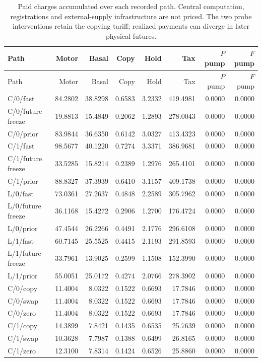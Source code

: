 \begin{longtable}{lrrrrrrr}
\caption{Paid charges accumulated over each recorded path. Central computation, registrations and external-supply infrastructure are not priced. The two probe interventions retain the copying tariff; realized payments can diverge in later physical futures.}\label{tab:young-paid}\\
\toprule
Path & Motor & Basal & Copy & Hold & Tax & $P$ pump & $F$ pump \\
\midrule\endfirsthead
\toprule
Path & Motor & Basal & Copy & Hold & Tax & $P$ pump & $F$ pump \\
\midrule\endhead
C/0/fast & 84.2802 & 38.8298 & 0.6583 & 3.2332 & 419.4981 & 0.0000 & 0.0000 \\
C/0/future freeze & 19.8813 & 15.4849 & 0.2062 & 1.2893 & 278.0043 & 0.0000 & 0.0000 \\
C/0/prior & 83.9844 & 36.6350 & 0.6142 & 3.0327 & 413.4323 & 0.0000 & 0.0000 \\
C/1/fast & 98.5677 & 40.1220 & 0.7274 & 3.3371 & 386.9681 & 0.0000 & 0.0000 \\
C/1/future freeze & 33.5285 & 15.8214 & 0.2389 & 1.2976 & 265.4101 & 0.0000 & 0.0000 \\
C/1/prior & 88.8327 & 37.3939 & 0.6410 & 3.1157 & 409.1738 & 0.0000 & 0.0000 \\
L/0/fast & 73.0361 & 27.2637 & 0.4848 & 2.2589 & 305.7962 & 0.0000 & 0.0000 \\
L/0/future freeze & 36.1168 & 15.4272 & 0.2906 & 1.2700 & 176.4724 & 0.0000 & 0.0000 \\
L/0/prior & 47.4544 & 26.2266 & 0.4491 & 2.1776 & 296.6108 & 0.0000 & 0.0000 \\
L/1/fast & 60.7145 & 25.5525 & 0.4415 & 2.1193 & 291.8593 & 0.0000 & 0.0000 \\
L/1/future freeze & 33.7961 & 13.9025 & 0.2599 & 1.1508 & 152.3990 & 0.0000 & 0.0000 \\
L/1/prior & 55.0051 & 25.0172 & 0.4274 & 2.0766 & 278.3902 & 0.0000 & 0.0000 \\
C/0/copy & 11.4004 & 8.0322 & 0.1522 & 0.6693 & 17.7846 & 0.0000 & 0.0000 \\
C/0/swap & 11.4004 & 8.0322 & 0.1522 & 0.6693 & 17.7846 & 0.0000 & 0.0000 \\
C/0/zero & 11.4004 & 8.0322 & 0.1522 & 0.6693 & 17.7846 & 0.0000 & 0.0000 \\
C/1/copy & 14.3899 & 7.8421 & 0.1435 & 0.6535 & 25.7639 & 0.0000 & 0.0000 \\
C/1/swap & 10.3628 & 7.7987 & 0.1388 & 0.6499 & 26.8165 & 0.0000 & 0.0000 \\
C/1/zero & 12.3100 & 7.8314 & 0.1424 & 0.6526 & 25.8860 & 0.0000 & 0.0000 \\
\bottomrule
\end{longtable}
